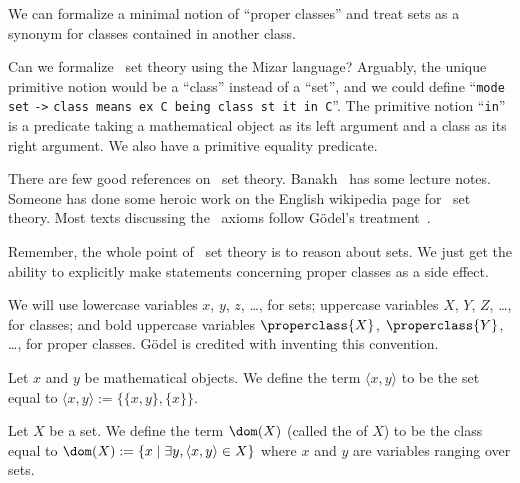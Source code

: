 \begin{node}\label{nbg-0000}%
We can formalize a minimal notion of ``proper classes'' and treat
sets as a synonym for classes contained in another class.
\end{node}

\begin{puzzle}\label{nbg-0001}%
Can we formalize \NBG\ set theory using the Mizar language? Arguably, the
unique primitive notion would be a ``class'' instead of a ``set'', and
we could define ``\texttt{mode set} \verb|->| \texttt{class means ex C
  being class st it in C}''. The primitive notion ``\texttt{in}'' is a
predicate taking a mathematical object as its left argument and a class
as its right argument. We also have a primitive equality predicate.

\begin{node}[References]\label{nbg-0002}%
There are few good references on \NBG\ set
theory. Banakh~\cite{banakh2023classical} has some lecture
notes. Someone has done some heroic work on the English wikipedia page
for \NBG\ set theory. Most texts discussing the \NBG\ axioms follow
G\"{o}del's treatment~\cite{godel1940consistency}.
\end{node}

\begin{node}\label{nbg-0003}%
Remember, the whole point of \NBG\ set theory is to reason about sets. We
just get the ability to explicitly make statements concerning proper
classes as a side effect.
\end{node}
\end{puzzle}

\begin{node}[Conventions]\label{nbg-000F}%
We will use lowercase variables $x$, $y$, $z$, \dots, for sets;
uppercase variables $X$, $Y$, $Z$, \dots, for classes; and bold
uppercase variables $\properclass{X}$, $\properclass{Y}$, \dots, for proper classes.
G\"{o}del is credited with inventing this convention.
\end{node}

\begin{definition}\label{nbg-0007}%
Let $x$ and $y$ be mathematical objects. We define the term $\langle x,y\rangle$
to be the set equal to $\langle x,y\rangle := \{\{x,y\}, \{x\}\}$.
\end{definition}

\begin{definition}\label{nbg-000A}%
Let $X$ be a set. We define the term $\dom(X)$ (called the
 of $X$) to be the class equal to
$\dom(X):=\{x\mid\exists y,\langle x,y\rangle\in X\}$ where $x$ and $y$
are variables ranging over sets.
\end{definition}

